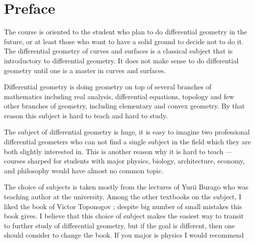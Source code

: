 \section*{Preface}

The course is oriented to the student who plan to do differential geometry in the future,
or at least those who want to have a solid ground to decide not to do it.
The differential geometry of curves and surfaces is a classical subject that is introductory to differential geometry.
It does not make sense to do differential geometry until one is a master in curves and surfaces.

Differential geometry is doing geometry on top of several branches of mathematics including real analysis, differential equations, topology and few other branches of geometry, including elementary and convex geometry.
By that reason this subject is hard to teach and hard to study.

The subject of differential geometry is huge,
it is easy to imagine two professional differential geometers who can not find a single subject in the field which they are both slightly interested in.
This is another reason why it is hard to teach --- courses sharped for students with major physics, biology, architecture, economy, and philosophy would have almost no common topic.

The choice of subjects is taken mostly from the lectures of Yurii Burago who was teaching author at the university.
Among the other textbooks on the subject, I liked the book of Victor Toponogov \cite{toponogov};
despite big number of small mistakes this book gives.
I believe that this choice of subject makes the easiest way to transit to further study of differential geometry, but if the goal is different, then one should consider to change the book.
If you major is physics I would recommend 
